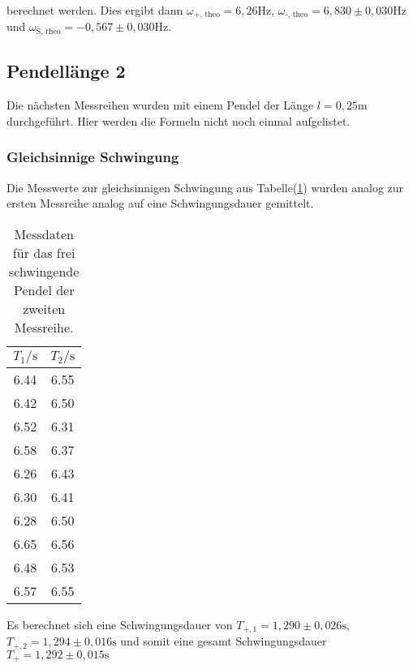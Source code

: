            \noindent berechnet werden. Dies ergibt dann $\omega_\text{+, theo} = 6,26 \si{\hertz}$, $\omega_\text{-, theo} = 6,830 \pm 0,030 \si{\hertz}$ 
            und $\omega_\text{S, theo} = -0,567 \pm 0,030 \si{\hertz}$.

    \subsection{Pendellänge 2}

        \noindent Die nächsten Messreihen wurden mit einem Pendel der Länge $l = 0,25 \si{\m}$ durchgeführt. Hier werden die Formeln 
        nicht noch einmal aufgelistet.

        \subsubsection{Gleichsinnige Schwingung}

            \noindent Die Messwerte zur gleichsinnigen Schwingung aus Tabelle(\ref{tab:frei2}) wurden analog zur ersten Messreihe analog auf 
            eine Schwingungsdauer gemittelt.

            \begin{table}[ht]
                \centering
                \caption{Messdaten für das frei schwingende Pendel der zweiten Messreihe.}
                \label{tab:frei2}
                \begin{tabular}{c c}
                 \toprule
                 $T_1 / \si{\s}$ & $T_2 / \si{\s}$\\
                 \midrule
                 6.44  &  6.55 \\
                 6.42  &  6.50 \\
                 6.52  &  6.31 \\
                 6.58  &  6.37 \\
                 6.26  &  6.43 \\
                 6.30  &  6.41 \\
                 6.28  &  6.50 \\
                 6.65  &  6.56 \\
                 6.48  &  6.53 \\
                 6.57  &  6.55 \\
                 \bottomrule
                \end{tabular}
            \end{table}
            
            \noindent Es berechnet sich eine Schwingungsdauer von $T_{+,1} = 1,290 \pm 0,026 \si{\second}$, $T_{+,2} = 1,294 \pm 0,016 \si{\second}$
            und somit eine gesamt Schwingungsdauer $T_+ = 1,292 \pm 0,015 \si{\second}$

